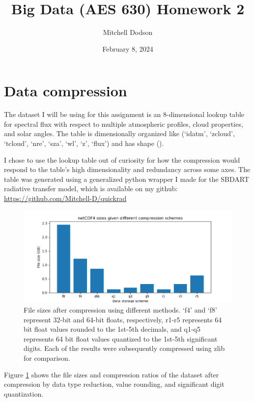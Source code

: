 \documentclass[12pt]{article}
\title{Big Data (AES 630) Homework 2}
\author{Mitchell Dodson}
\date{February 8, 2024}
\begin{document}
\maketitle

\section{Data compression}

The dataset I will be using for this assignment is an 8-dimensional lookup table for spectral flux with respect to multiple atmospheric profiles, cloud properties, and solar angles. The table is dimensionally organized like (`idatm', `zcloud', `tcloud', `nre', `sza', `wl', `z', `flux') and has shape ().

I chose to use the lookup table out of curiosity for how the compression would respond to the table's high dimensionality and redundancy across some axes. The table was generated using a generalized python wrapper I made for the SBDART radiative transfer model, which is available on my github: \url{https://github.com/Mitchell-D/quickrad}

\begin{figure}[h!]
    \centering
    \includegraphics[width=.8\paperwidth]{figs/sizes.png}
    \caption{File sizes after compression using different methods. `f4' and `f8' represent 32-bit and 64-bit floats, respectively, r1-r5 represents 64 bit float values rounded to the 1st-5th decimals, and q1-q5 represents 64 bit float values quantized to the 1st-5th significant digits. Each of the results were subsequently compressed using zlib for comparison.}
    \label{sizes}
\end{figure}

Figure \ref{sizes} shows the file sizes and compression ratios of the dataset after compression by data type reduction, value rounding, and significant digit quantization.
\end{document}
